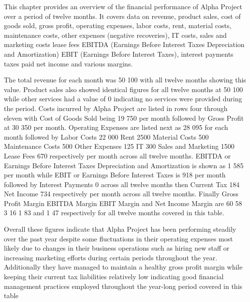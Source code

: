 

This chapter provides an overview of the financial performance of Alpha Project over a period of twelve months. It covers data on revenue, product sales, cost of goods sold, gross profit, operating expenses, labor costs, rent, material costs, maintenance costs, other expenses (negative recoveries), IT costs, sales and marketing costs lease fees EBITDA (Earnings Before Interest Taxes Depreciation and Amortization) EBIT (Earnings Before Interest Taxes), interest payments taxes paid net income and various margins. 

The total revenue for each month was 50 100 with all twelve months showing this value. Product sales also showed identical figures for all twelve months at 50 100 while other services had a value of 0 indicating no services were provided during the period. Costs incurred by Alpha Project are listed in rows four through eleven with Cost of Goods Sold being 19 750 per month followed by Gross Profit at 30 350 per month. Operating Expenses are listed next as 28 095 for each month followed by Labor Costs 22 000 Rent 2500 Material Costs 500 Maintenance Costs 500 Other Expenses 125 IT 300 Sales and Marketing 1500 Lease Fees 670 respectively per month across all twelve months. 
EBITDA or Earnings Before Interest Taxes Depreciation and Amortization is shown as 1 585 per month while EBIT or Earnings Before Interest Taxes is 918 per month followed by Interest Payments 0 across all twelve months then Current Tax 184 Net Income 734 respectively per month across all twelve months. Finally Gross Profit Margin EBITDA Margin EBIT Margin and Net Income Margin are 60 58 3 16 1 83 and 1 47 respectively for all twelve months covered in this table.

Overall these figures indicate that Alpha Project has been performing steadily over the past year despite some fluctuations in their operating expenses most likely due to changes in their business operations such as hiring new staff or increasing marketing efforts during certain periods throughout the year. Additionally they have managed to maintain a healthy gross profit margin while keeping their current tax liabilities relatively low indicating good financial management practices employed throughout the year-long period covered in this table